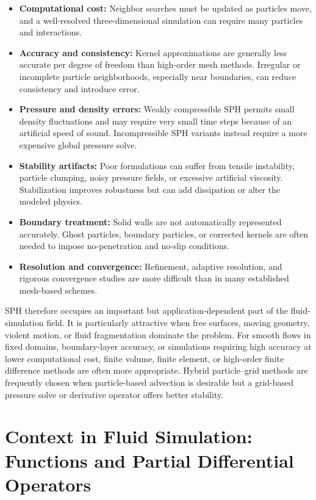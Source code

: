 \documentclass[11pt]{article}
\begin{document}
\begin{itemize}
    \item \textbf{Computational cost:} Neighbor searches must be updated as
    particles move, and a well-resolved three-dimensional simulation can
    require many particles and interactions.
    \item \textbf{Accuracy and consistency:} Kernel approximations are
    generally less accurate per degree of freedom than high-order mesh
    methods. Irregular or incomplete particle neighborhoods, especially near
    boundaries, can reduce consistency and introduce error.
    \item \textbf{Pressure and density errors:} Weakly compressible SPH permits
    small density fluctuations and may require very small time steps because
    of an artificial speed of sound. Incompressible SPH variants instead
    require a more expensive global pressure solve.
    \item \textbf{Stability artifacts:} Poor formulations can suffer from
    tensile instability, particle clumping, noisy pressure fields, or
    excessive artificial viscosity. Stabilization improves robustness but can
    add dissipation or alter the modeled physics.
    \item \textbf{Boundary treatment:} Solid walls are not automatically
    represented accurately. Ghost particles, boundary particles, or corrected
    kernels are often needed to impose no-penetration and no-slip conditions.
    \item \textbf{Resolution and convergence:} Refinement, adaptive resolution,
    and rigorous convergence studies are more difficult than in many
    established mesh-based schemes.
\end{itemize}

SPH therefore occupies an important but application-dependent part of the
fluid-simulation field. It is particularly attractive when free surfaces,
moving geometry, violent motion, or fluid fragmentation dominate the problem.
For smooth flows in fixed domains, boundary-layer accuracy, or simulations
requiring high accuracy at lower computational cost, finite volume, finite
element, or high-order finite difference methods are often more appropriate.
Hybrid particle--grid methods are frequently chosen when particle-based
advection is desirable but a grid-based pressure solve or derivative operator
offers better stability.

\section{Context in Fluid Simulation: Functions and Partial Differential Operators}
\end{document}
